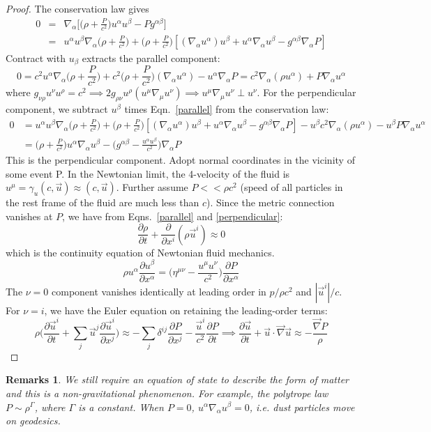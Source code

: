 \documentclass[a4paper]{article}
\newtheorem{remarks}{Remarks}[section]
\theoremstyle{new}
\begin{document}
\begin{proof}
The conservation law gives
\begin{eqnarray}
0&=&\nabla_\alpha\bigg[\bigg(\rho+\frac{P}{c^2}\bigg)u^\alpha u^\beta-Pg^{\alpha\beta}\bigg]\nonumber\\&=&u^\alpha u^\beta\nabla_\alpha\bigg(\rho+\frac{P}{c^2}\bigg)+\bigg(\rho+\frac{P}{c^2}\bigg)[(\nabla_\alpha u^\alpha)u^\beta+u^\alpha\nabla_\alpha u^\beta-g^{\alpha\beta}\nabla_\alpha P]\nonumber
\end{eqnarray}
Contract with $u_\beta$ extracts the parallel component:
\begin{equation}
0=c^2u^\alpha\nabla_\alpha\bigg(\rho+\frac{P}{c^2}\bigg)+c^2\bigg(\rho+\frac{P}{c^2}\bigg)(\nabla_\alpha u^\alpha)-u^\alpha\nabla_\alpha P=c^2\nabla_\alpha(\rho u^\alpha)+P\nabla_\alpha u^\alpha\label{parallel}
\end{equation}
where $g_{\nu\rho}u^\nu u^\rho =c^2\implies 2g_{\rho\nu}u^\rho(u^\mu\nabla_\mu u^\nu)\implies u^\mu\nabla_\mu u^\nu\perp u^\nu$. For the perpendicular component, we subtract $u^\beta$ times Eqn.~\ref{parallel} from the conservation law:
\begin{align}
0&=u^\alpha u^\beta\nabla_\alpha\bigg(\rho+\frac{P}{c^2}\bigg)+\bigg(\rho+\frac{P}{c^2}\bigg)[(\nabla_\alpha u^\alpha)u^\beta+u^\alpha\nabla_\alpha u^\beta-g^{\alpha\beta}\nabla_\alpha P]-u^\beta c^2\nabla_\alpha(\rho u^\alpha)-u^\beta P\nabla_\alpha u^\alpha\nonumber\\&=\bigg(\rho+\frac{P}{c^2}\bigg)u^\alpha\nabla_\alpha u^\beta-\bigg(g^{\alpha\beta}-\frac{u^\alpha u^\beta}{c^2}\bigg)\nabla_\alpha P\label{perpendicular}
\end{align}
This is the perpendicular component. Adopt normal coordinates in the vicinity of some event P. In the Newtonian limit, the 4-velocity of the fluid is $u^\mu=\gamma_u(c,\vec{u})\approx(c,\vec{u})$. Further assume $P<<\rho c^2$ (speed of all particles in the rest frame of the fluid are much less than $c$). Since the metric connection vanishes at $P$, we have from Eqns.~\ref{parallel} and \ref{perpendicular}:
$$\frac{\partial\rho}{\partial t}+\frac{\partial}{\partial x^i}(\rho\vec{u}^i)\approx 0$$
which is the continuity equation of Newtonian fluid mechanics.
$$\rho u^\alpha\frac{\partial u^\beta}{\partial x^\alpha}=\bigg(\eta^{\mu\nu}-\frac{u^\mu u^\nu}{c^2}\bigg)\frac{\partial P}{\partial x^\alpha}$$
The $\nu=0$ component vanishes identically at leading order in $p/\rho c^2$ and $|\vec{u}^i|/c$. For $\nu=i$, we have the Euler equation on retaining the leading-order terms:
$$\rho\bigg(\frac{\partial\vec{u}^i}{\partial t}+\sum_j\vec{u}^j\frac{\partial\vec{u}^i}{\partial x^j}\bigg)\approx-\sum_j\delta^{ij}\frac{\partial P}{\partial x^j}-\frac{\vec{u}^i}{c^2}\frac{\partial P}{\partial t}\implies\frac{\partial\vec{u}}{\partial t}+\vec{u}\cdot\vec{\nabla}\vec{u}\approx-\frac{\vec{\nabla}P}{\rho}$$
\end{proof}
\begin{remarks}
We still require an equation of state to describe the form of matter and this is a non-gravitational phenomenon. For example, the polytrope law $P\sim\rho^\Gamma$, where $\Gamma$ is a constant. When $P=0$, $u^\alpha\nabla_\alpha u^\beta=0$, i.e. dust particles move on geodesics.
\end{remarks}
\newpage
\end{document}
